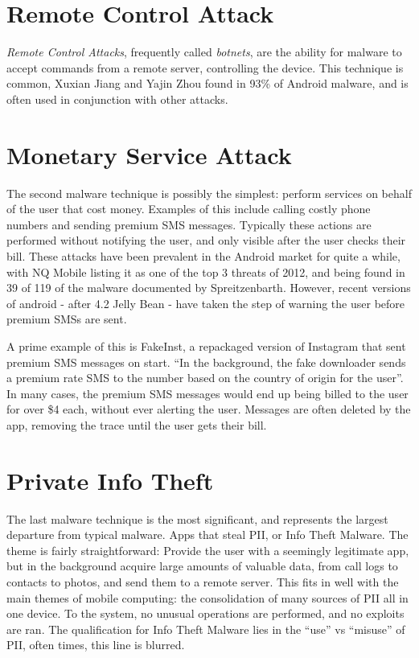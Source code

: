 \section{Remote Control Attack}
\textit{Remote Control Attacks}, frequently called \textit{botnets}, are the ability for malware to accept commands from a remote server, controlling the device. This technique is common, Xuxian Jiang
 and Yajin Zhou\citep{zhou2012dissecting} found in 93\% of Android malware, and is often used in conjunction with other attacks\citep{spreitzenbarth2013}.

\section{Monetary Service Attack}
\label{sec:premiumsms}
The second malware technique is possibly the simplest: perform services on behalf of the user that cost money. Examples of this include calling costly phone numbers and sending premium SMS messages. Typically these actions are performed without notifying the user, and only visible after the user checks their bill. These attacks have been prevalent in the Android market for quite a while, with NQ Mobile\citep{nq2013} listing it as one of the top 3 threats of 2012, and being found in 39 of 119 of the malware documented by Spreitzenbarth\citep{spreitzenbarth2013}. However, recent versions of android - after 4.2 Jelly Bean\citep{androidjbsecurity} - have taken the step of warning the user before premium SMSs are sent. %

A prime example of this is FakeInst\citep{avastfakeinst}, a repackaged version of Instagram\citep{instagramandroid} that sent premium SMS messages on start. ``In the background, the fake downloader sends a premium rate SMS to the number based on the country of origin for the user''\citep{avastfakeinst}. In many cases, the premium SMS messages would end up being billed to the user for over \$4 each\citep{avastfakeinst}, without ever alerting the user. Messages are often deleted by the app, removing the trace until the user gets their bill.

\section{Private Info Theft}
The last malware technique is the most significant, and represents the largest departure from typical malware. Apps that steal PII, or Info Theft Malware. The theme is fairly straightforward: Provide the user with a seemingly legitimate app, but in the background acquire large amounts of valuable data, from call logs to contacts to photos, and send them to a remote server. This fits in well with the main themes of mobile computing: the consolidation of many sources of PII all in one device. 
To the system, no unusual operations are performed, and no exploits are ran. The qualification for Info Theft Malware lies in the ``use'' vs ``misuse'' of PII, often times, this line is blurred.

